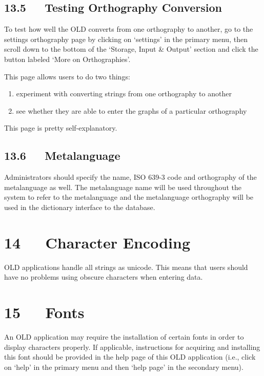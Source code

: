 \documentclass[letterpaper,10pt,english]{sphinxmanual}
\begin{document}
\section{13.5   Testing Orthography Conversion}
\label{user_guide:testing-orthography-conversion}
To test how well the OLD converts from one orthography to another, go to the
settings orthography page by clicking on `settings' in the primary menu, then
scroll down to the bottom of the `Storage, Input \& Output' section and click
the button labeled `More on Orthographies'.

This page allows users to do two things:
\begin{enumerate}
\item {} 
experiment with converting strings from one orthography to another

\item {} 
see whether they are able to enter the graphs of a particular orthography

\end{enumerate}

This page is pretty self-explanatory.


\section{13.6   Metalanguage}
\label{user_guide:metalanguage}
Administrators should specify the name, ISO 639-3 code and orthography of the
metalanguage as well.  The metalanguage name will be used throughout the system
to refer to the metalanguage and the metalanguage orthography will be used in
the dictionary interface to the database.


\chapter{14   Character Encoding}
\label{user_guide:character-encoding}
OLD applications handle all strings as unicode.  This means that users should
have no problems using obscure characters when entering data.


\chapter{15   Fonts}
\label{user_guide:fonts}
An OLD application may require the installation of certain fonts in order to
display characters properly.  If applicable, instructions for acquiring and
installing this font should be provided in the help page of this OLD
application (i.e., click on `help' in the primary menu and then `help page' in
the secondary menu).
\end{document}
